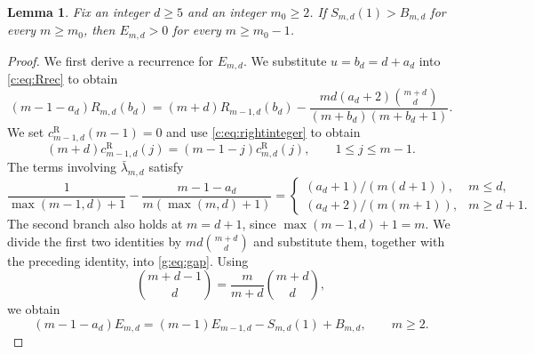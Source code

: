 \documentclass[10pt,a4paper]{article}
\numberwithin{equation}{section}
\newtheorem{lemma}[theorem]{Lemma}
\theoremstyle{remark}\newtheorem{remark}[theorem]{Remark}
\begin{document}
\begin{lemma}\label{g:lem:tail}
Fix an integer $d\ge5$ and an integer $m_0\ge2$.
If $S_{m,d}(1)>B_{m,d}$ for every $m\ge m_0$, then
$E_{m,d}>0$ for every $m\ge m_0-1$.
\end{lemma}
\begin{proof}
We first derive a recurrence for $E_{m,d}$. We substitute $u=b_d=d+a_d$
into \eqref{c:eq:Rrec} to obtain
\[
 (m-1-a_d)R_{m,d}(b_d)=(m+d)R_{m-1,d}(b_d)
 -\frac{md(a_d+2)\binom{m+d}{d}}{(m+b_d)(m+b_d+1)}.
\]
We set $c_{m-1,d}^{\mathrm R}(m-1)=0$ and use
\eqref{c:eq:rightinteger} to obtain
\[
 (m+d)c_{m-1,d}^{\mathrm R}(j)
 =(m-1-j)c_{m,d}^{\mathrm R}(j),\qquad1\le j\le m-1.
\]
The terms involving $\bar\lambda_{m,d}$ satisfy
\[
 \frac1{\max(m-1,d)+1}
 -\frac{m-1-a_d}{m(\max(m,d)+1)}
 =
 \begin{cases}
 (a_d+1)/(m(d+1)),&m\le d,\\
 (a_d+2)/(m(m+1)),&m\ge d+1.
 \end{cases}
\]
The second branch also holds at $m=d+1$, since
$\max(m-1,d)+1=m$.
We divide the first two identities by $md\binom{m+d}{d}$ and
substitute them, together with the preceding identity,
into \eqref{g:eq:gap}. Using
\[
 \binom{m+d-1}{d}=\frac{m}{m+d}\binom{m+d}{d},
\]
we obtain
\begin{equation}\label{g:eq:backward}
 (m-1-a_d)E_{m,d}=(m-1)E_{m-1,d}-S_{m,d}(1)+B_{m,d},
 \qquad m\ge2.
\end{equation}


\end{proof}
\end{document}
